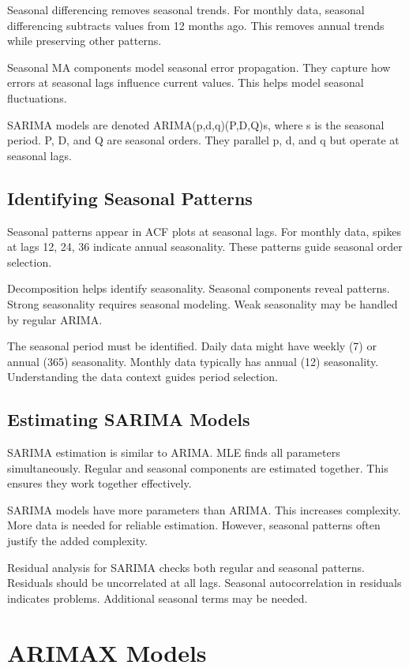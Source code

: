 Seasonal differencing removes seasonal trends. For monthly data, seasonal differencing subtracts values from 12 months ago. This removes annual trends while preserving other patterns.

Seasonal MA components model seasonal error propagation. They capture how errors at seasonal lags influence current values. This helps model seasonal fluctuations.

SARIMA models are denoted ARIMA(p,d,q)(P,D,Q)s, where s is the seasonal period. P, D, and Q are seasonal orders. They parallel p, d, and q but operate at seasonal lags.

\subsection{Identifying Seasonal Patterns}

Seasonal patterns appear in ACF plots at seasonal lags. For monthly data, spikes at lags 12, 24, 36 indicate annual seasonality. These patterns guide seasonal order selection.

Decomposition helps identify seasonality. Seasonal components reveal patterns. Strong seasonality requires seasonal modeling. Weak seasonality may be handled by regular ARIMA.

The seasonal period must be identified. Daily data might have weekly (7) or annual (365) seasonality. Monthly data typically has annual (12) seasonality. Understanding the data context guides period selection.

\subsection{Estimating SARIMA Models}

SARIMA estimation is similar to ARIMA. MLE finds all parameters simultaneously. Regular and seasonal components are estimated together. This ensures they work together effectively.

SARIMA models have more parameters than ARIMA. This increases complexity. More data is needed for reliable estimation. However, seasonal patterns often justify the added complexity.

Residual analysis for SARIMA checks both regular and seasonal patterns. Residuals should be uncorrelated at all lags. Seasonal autocorrelation in residuals indicates problems. Additional seasonal terms may be needed.

\section{ARIMAX Models}

